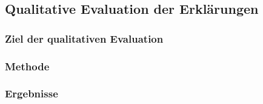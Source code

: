 \subsection{Qualitative Evaluation der Erklärungen}
\label{sec:study_results_qualitativ}

\subsubsection{Ziel der qualitativen Evaluation}

\subsubsection{Methode}

\subsubsection{Ergebnisse}